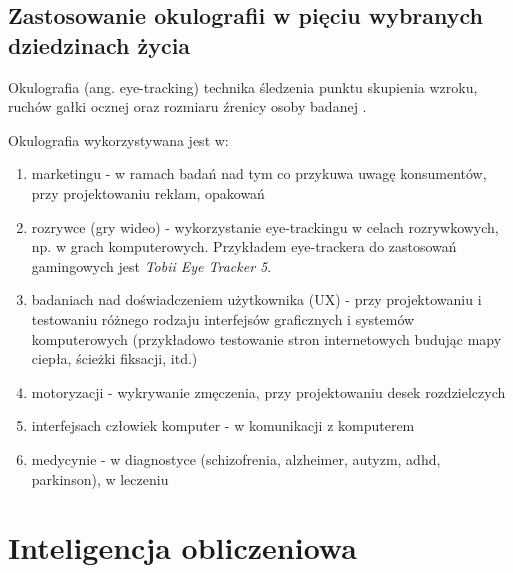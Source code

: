 \documentclass[wi]{zut}
\begin{document}


\subsection{Zastosowanie okulografii w pięciu wybranych dziedzinach życia}

Okulografia (ang. eye-tracking) technika śledzenia punktu skupienia wzroku, ruchów gałki ocznej oraz rozmiaru źrenicy osoby badanej \cite{wiki:Okulografia}.

Okulografia wykorzystywana jest w:

\begin{enumerate}
    \item marketingu - w ramach badań nad tym co przykuwa uwagę konsumentów, przy projektowaniu reklam, opakowań
    \item rozrywce (gry wideo) - wykorzystanie eye-trackingu w celach rozrywkowych, np. w grach komputerowych. Przykładem eye-trackera do zastosowań gamingowych jest \textit{Tobii Eye Tracker 5}.
    \item badaniach nad doświadczeniem użytkownika (UX) - przy projektowaniu i testowaniu różnego rodzaju interfejsów graficznych i systemów komputerowych (przykładowo testowanie stron internetowych budując mapy ciepła, ścieżki fiksacji, itd.)
    \item motoryzacji - wykrywanie zmęczenia, przy projektowaniu desek rozdzielczych
    \item interfejsach człowiek komputer - w komunikacji z komputerem 
    \item medycynie - w diagnostyce (schizofrenia, alzheimer, autyzm, adhd, parkinson), w leczeniu
\end{enumerate}

\section{Inteligencja obliczeniowa}
\end{document}
